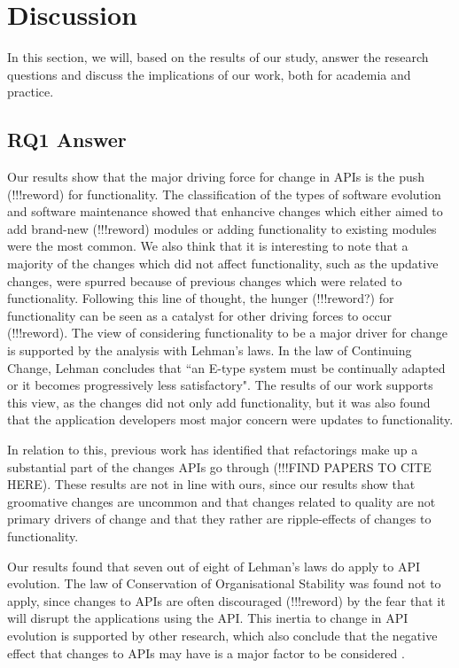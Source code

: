 \documentclass{sig-alternate}
\begin{document}
\newpage

\newpage

\section{Discussion} \label{discussion}
In this section, we will, based on the results of our study, answer the research questions and discuss the implications of our work, both for academia and practice. 


\subsection{RQ1 Answer}  
Our results show that the major driving force for change in APIs is the push (!!!reword) for functionality. The classification of the types of software evolution and software maintenance showed that enhancive changes which either aimed to add brand-new (!!!reword) modules or adding functionality to existing modules were the most common. We also think that it is interesting to note that a majority of the changes which did not affect functionality, such as the updative changes, were spurred because of previous changes which were related to functionality. Following this line of thought, the hunger (!!!reword?) for functionality can be seen as a catalyst for other driving forces to occur (!!!reword). The view of considering functionality to be a major driver for change is supported by the analysis with Lehman's laws. In the law of Continuing Change, Lehman concludes that ``an E-type system must be continually adapted or it becomes progressively less satisfactory". The results of our work supports this view, as the changes did not only add functionality, but it was also found that the application developers most major concern were updates to functionality. 

In relation to this, previous work has identified that refactorings make up a substantial part of the changes APIs go through (!!!FIND PAPERS TO CITE HERE). These results are not in line with ours, since our results show that groomative changes are uncommon and that changes related to quality are not primary drivers of change and that they rather are ripple-effects of changes to functionality.  


Our results found that seven out of eight of Lehman's laws do apply to API evolution. The law of Conservation of Organisational Stability was found not to apply, since changes to APIs are often discouraged (!!!reword) by the fear that it will disrupt the applications using the API. This inertia to change in API evolution is supported by other research, which also conclude that the negative effect that changes to APIs may have is a major factor to be considered \cite{google_talk, henning2007api, mcdonnell2013empirical, robbes2012developers}. 
\end{document}
